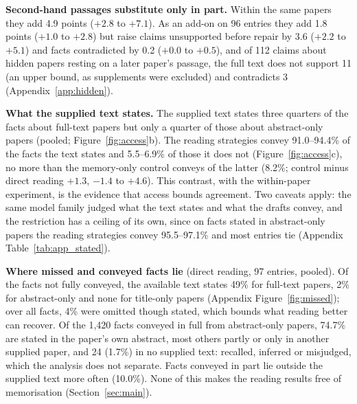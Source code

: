 \documentclass{article} %
\begin{document}
\textbf{Second-hand passages substitute only in part.} Within the same papers they add 4.9 points ($+2.8$ to $+7.1$). As an add-on on 96 entries they add 1.8 points ($+1.0$ to $+2.8$) but raise claims unsupported before repair by 3.6 ($+2.2$ to $+5.1$) and facts contradicted by 0.2 ($+0.0$ to $+0.5$), and of 112 claims about hidden papers resting on a later paper's passage, the full text does not support 11 (an upper bound, as supplements were excluded) and contradicts 3 (Appendix~\ref{app:hidden}).

\textbf{What the supplied text states.} The supplied text states three quarters of the facts about full-text papers but only a quarter of those about abstract-only papers (pooled; Figure~\ref{fig:access}b). The reading strategies convey 91.0--94.4\% of the facts the text states and 5.5--6.9\% of those it does not (Figure~\ref{fig:access}c), no more than the memory-only control conveys of the latter (8.2\%; control minus direct reading $+1.3$, $-1.4$ to $+4.6$). This contrast, with the within-paper experiment, is the evidence that access bounds agreement. Two caveats apply: the same model family judged what the text states and what the drafts convey, and the restriction has a ceiling of its own, since on facts stated in abstract-only papers the reading strategies convey 95.5--97.1\% and most entries tie (Appendix Table~\ref{tab:app_stated}).

\textbf{Where missed and conveyed facts lie} (direct reading, 97 entries, pooled). Of the facts not fully conveyed, the available text states 49\% for full-text papers, 2\% for abstract-only and none for title-only papers (Appendix Figure~\ref{fig:missed}); over all facts, 4\% were omitted though stated, which bounds what reading better can recover. Of the 1,420 facts conveyed in full from abstract-only papers, 74.7\% are stated in the paper's own abstract, most others partly or only in another supplied paper, and 24 (1.7\%) in no supplied text: recalled, inferred or misjudged, which the analysis does not separate. Facts conveyed in part lie outside the supplied text more often (10.0\%). None of this makes the reading results free of memorisation (Section~\ref{sec:main}).
\end{document}
